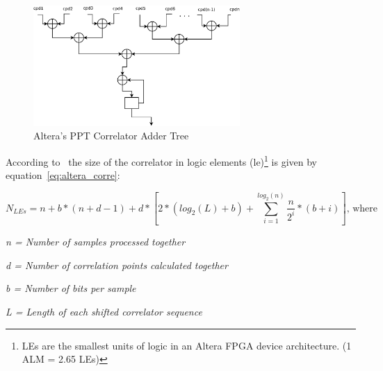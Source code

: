  \begin{figure}[!hbt]
  \centering
    \includegraphics[width=0.7\textwidth]
      {./figures/adder_tree_ppt_correlator}
  \caption{Altera's PPT Correlator Adder Tree}
  \label{fig:ppt_correlator_adder}
\end{figure}








According to~\cite{altera_wp} the size of the correlator in logic elements (\ac{le})\footnote{LEs are the smallest units of logic in an Altera FPGA device architecture. (1 ALM = 2.65 LEs)} is given by equation~\ref{eq:altera_corre}:
 
\begin{equation} 
N_{LEs} = n + b*(n+d-1)+d*[2*(log_{2}(L)+b)+\sum_{i=1}^{log_2(n)}{\frac{n}{2^{i}}*(b+i)}]  \text{,  where}
    \label{eq:altera_corre} 
\end{equation}
   
\begin{description}  
\item \textit{n = Number of samples processed together} 
\item \textit{d = Number of correlation points calculated together}
\item \textit{b = Number of bits per sample}
\item \textit{L = Length of each shifted correlator sequence}
\end{description}
 

